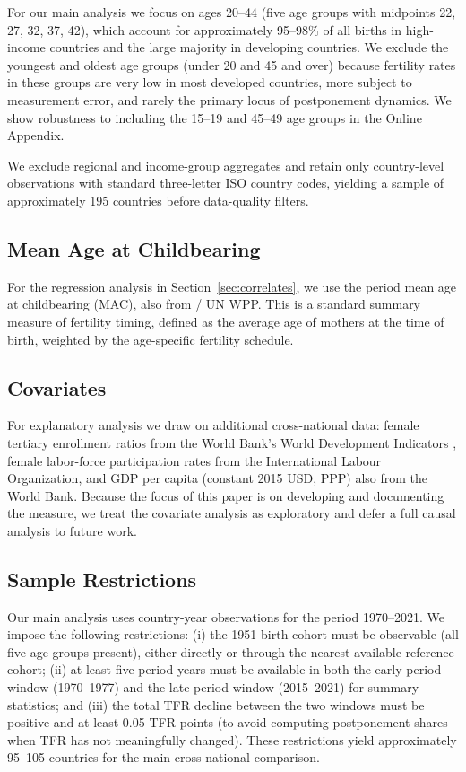 \documentclass[12pt]{article}
\begin{document}
For our main analysis we focus on ages 20--44 (five age groups with
midpoints 22, 27, 32, 37, 42), which account for approximately 95--98\%
of all births in high-income countries and the large majority in
developing countries.  We exclude the youngest and oldest age groups
(under 20 and 45 and over) because fertility rates in these groups are
very low in most developed countries, more subject to measurement
error, and rarely the primary locus of postponement dynamics.  We show
robustness to including the 15--19 and 45--49 age groups in the Online
Appendix.

We exclude regional and income-group aggregates and retain only
country-level observations with standard three-letter ISO country codes,
yielding a sample of approximately 195 countries before data-quality
filters.

\subsection{Mean Age at Childbearing}

For the regression analysis in Section~\ref{sec:correlates}, we use the
period mean age at childbearing (MAC), also from \citet{OWID2024} /
UN WPP.  This is a standard summary measure of fertility timing, defined
as the average age of mothers at the time of birth, weighted by the
age-specific fertility schedule.

\subsection{Covariates}

For explanatory analysis we draw on additional cross-national data:
female tertiary enrollment ratios from the World Bank's World
Development Indicators \citep{WorldBank2023}, female labor-force
participation rates from the International Labour Organization, and
GDP per capita (constant 2015 USD, PPP) also from the World Bank.
Because the focus of this paper is on developing and documenting the
measure, we treat the covariate analysis as exploratory and defer
a full causal analysis to future work.

\subsection{Sample Restrictions}

Our main analysis uses country-year observations for the period
1970--2021.  We impose the following restrictions: (i) the 1951 birth
cohort must be observable (all five age groups present), either
directly or through the nearest available reference cohort;
(ii) at least five period years must be available in both the
early-period window (1970--1977) and the late-period window
(2015--2021) for summary statistics; and (iii) the total TFR decline
between the two windows must be positive and at least 0.05 TFR points
(to avoid computing postponement shares when TFR has not meaningfully
changed).  These restrictions yield approximately 95--105 countries
for the main cross-national comparison.
\end{document}
